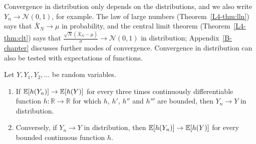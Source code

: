 Convergence in distribution only depends on the distributions, and we also write $Y_n \to \mathcal{N}(0, 1)$, for example. The law of large numbers (Theorem~\ref{L4-thm:lln}) says that $\bar X_N \to \mu$ in probability, and the central limit theorem (Theorem~\ref{L4-thm:clt}) says that $\frac{\sqrt{N}(\bar X_N - \mu)}{\sigma} \to \mathcal{N}(0, 1)$ in distribution; Appendix~\ref{B-chapter} discusses further modes of convergence. Convergence in distribution can also be tested with expectations of functions.

\begin{lemma}\label{L4-lem:test-functions}
    Let $Y, Y_1, Y_2, \ldots$ be random variables.
    \begin{enumerate}
        \item If $\mathbb{E}[h(Y_n)] \to \mathbb{E}[h(Y)]$ for every three times continuously differentiable function $h: \mathbb{R} \to \mathbb{R}$ for which $h$, $h'$, $h''$ and $h'''$ are bounded, then $Y_n \to Y$ in distribution.
        \item Conversely, if $Y_n \to Y$ in distribution, then $\mathbb{E}[h(Y_n)] \to \mathbb{E}[h(Y)]$ for every bounded continuous function $h$.
    \end{enumerate}
\end{lemma}

